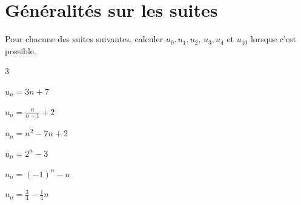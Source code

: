\documentclass[11pt,a4paper]{article}  %
\begin{document}
	\graphicspath{{img_oblig/}}
	
	\begin{center}
		
		
	\end{center}
	
\section{Généralités sur les suites}


Pour chacune des suites suivantes, calculer $u_0, u_1, u_2$, $u_3, u_4$ et $u_{10}$ lorsque c'est possible.
\begin{multicols}{3}
	\begin{enumMet}
		\item $u_n=3 n+7$
		\item $u_n=\frac{n}{n+1}+2$
		\item $u_n=n^2-7 n+2$
		\item $u_n=2^n-3$	
		\item $u_n=(-1)^n-n$
		\item $u_n=\frac{3}{4}-\frac{1}{4} n$
	\end{enumMet}
\end{multicols}

\end{document}
